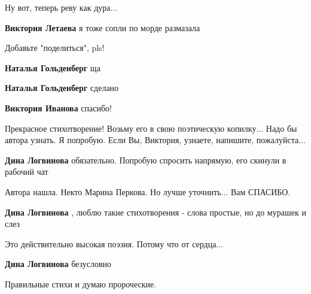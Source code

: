\begin{itemize} %
Ну вот, теперь реву как дура...

\textbf{Виктория Летаева} я тоже сопли по морде размазала


Добавьте "поделиться", pls!

\begin{itemize} %
\textbf{Наталья Гольденберг} ща

\textbf{Наталья Гольденберг} сделано

\textbf{Виктория Иванова} спасибо!
\end{itemize} %




Прекрасное стихотворение! Возьму его в свою поэтическую копилку... Надо бы
автора узнать. Я попробую. Если Вы, Виктория, узнаете, напишите, пожалуйста...

\begin{itemize} %
\textbf{Дина Логвинова} обязательно. Попробую спросить напрямую, его скинули в рабочий чат

Автора нашла. Некто Марина Перкова. Но лучше уточнить... Вам СПАСИБО.

\textbf{Дина Логвинова} , люблю такие стихотворения - слова простые, но до мурашек и слез

Это действительно высокая поэзия. Потому что от сердца...

\textbf{Дина Логвинова} безусловно
\end{itemize} %

Правильные стихи и думаю пророческие.

\end{itemize} %

